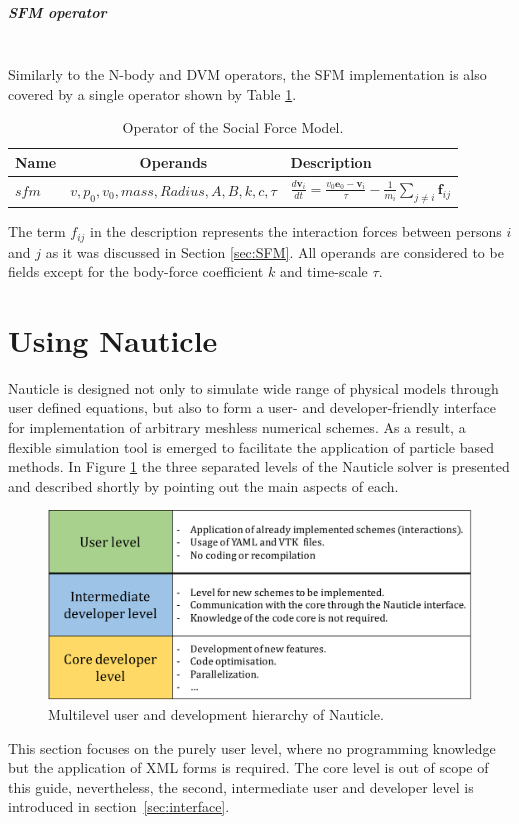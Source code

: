 \documentclass[a4paper,12pt,openany]{book}
\newcommand{\mysubparagraph}[1]{\subparagraph{#1}\mbox{}\\}
\theoremstyle{break}
\begin{document}
\mysubparagraph{SFM operator}
Similarly to the N-body and DVM operators, the SFM implementation is also covered by a single operator shown by Table \ref{tbl:SFM_op}.
\begin{table} [h!]
\begin{center}
\caption{Operator of the Social Force Model.} \label{tbl:SFM_op}
\begin{tabular}{ l c l }
\toprule[1.5pt]
\bf Name & \bf Operands & \bf Description \\ 
\midrule
$sfm$ & $v,p_0,v_0,mass,Radius,A,B,k,c,\tau$ & $\frac{d\textbf{v}_i}{dt}=\frac{v_0\textbf{e}_0-\textbf{v}_i}{\tau}-\frac{1}{m_i}\sum_{j\neq i}{\textbf{f}_{ij}}$ \\
\bottomrule[1.25pt]
\end{tabular}
\end{center}
\end{table}
The term $f_{ij}$ in the description represents the interaction forces between persons $i$ and $j$ as it was discussed in Section \ref{sec:SFM}. All operands are considered to be fields except for the body-force coefficient $k$ and time-scale $\tau$.


\section{Using Nauticle} \label{sec:usage_of_nauticle}
Nauticle is designed not only to simulate wide range of physical models through user defined equations, but also to form a user- and developer-friendly interface for implementation of arbitrary meshless numerical schemes. As a result, a flexible simulation tool is emerged to facilitate the application of particle based methods. In Figure \ref{fig:three_levels} the three separated levels of the Nauticle solver is presented and described shortly by pointing out the main aspects of each.
\begin{figure}[H]
  \includegraphics[scale=0.55]{three_levels.pdf}
  \centering
  \caption{Multilevel user and development hierarchy of Nauticle.}
  \label{fig:three_levels}
\end{figure}
This section focuses on the purely user level, where no programming knowledge but the application of XML forms is required. The core level is out of scope of this guide, nevertheless, the second, intermediate user and developer level is introduced in section \ref{sec:interface}. 
\end{document}
